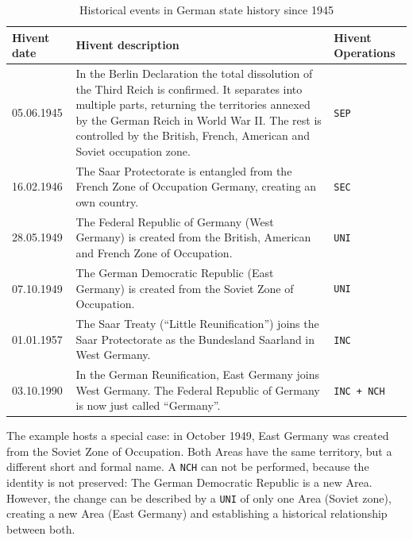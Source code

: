 \begin{table}[ht]
\begin{center}
\begin{tabular}{l p{8.5cm} l}
  \toprule
  Hivent date & Hivent description & Hivent Operations \\
  \midrule

    05.06.1945
  & \footnotesize{In the Berlin Declaration the total dissolution of the Third Reich is confirmed. It separates into multiple parts, returning the territories annexed by the German Reich in World War II. The rest is controlled by the British, French, American and Soviet occupation zone.}
  & \texttt{SEP} \\

    16.02.1946
  & \footnotesize{The Saar Protectorate is entangled from the French Zone of Occupation Germany, creating an own country.}
  & \texttt{SEC} \\

    28.05.1949
  & \footnotesize{The Federal Republic of Germany (West Germany) is created from the British, American and French Zone of Occupation.}
  & \texttt{UNI} \\

    07.10.1949
  & \footnotesize{The German Democratic Republic (East Germany) is created from the Soviet Zone of Occupation.}
  & \texttt{UNI} \\

    01.01.1957
  & \footnotesize{The Saar Treaty (``Little Reunification'') joins the Saar Protectorate as the Bundesland Saarland in West Germany.}
  & \texttt{INC} \\

    03.10.1990
  & \footnotesize{In the German Reunification, East Germany joins West Germany. The Federal Republic of Germany is now just called ``Germany''.}
  & \texttt{INC + NCH} \\

  \bottomrule
\end{tabular}
\caption{Historical events in German state history since 1945}
\label{tab:german_history_since_1945}
\end{center}
\end{table}

The example hosts a special case: in October 1949, East Germany was created from the Soviet Zone of Occupation. Both Areas have the same territory, but a different short and formal name. A \texttt{NCH} can not be performed, because the identity is not preserved: The German Democratic Republic is a new Area. However, the change can be described by a \texttt{UNI} of only one Area (Soviet zone), creating a new Area (East Germany) and establishing a historical relationship between both.

